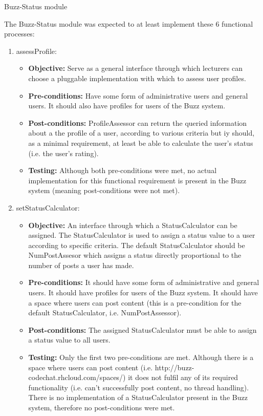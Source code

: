 \item Buzz-Status module
	
The Buzz-Status module was expected to at least implement these 6 functional processes:
	
\begin{enumerate}
	\item assessProfile:
	\begin{itemize}
		\item\textbf{Objective: } Serve as a general interface through which lecturers can choose a pluggable implementation with which to assess user profiles.
		\item\textbf{Pre-conditions: } Have some form of administrative users and general users. It should also have profiles for users of the Buzz system. 
		\item\textbf{Post-conditions: } ProfileAssessor can return the queried information about a the profile of a user, according to various criteria but iy should, as a minimal requirement, at least be able to calculate the user’s status (i.e. the user’s rating).
		\item\textbf{Testing: } Although both pre-conditions were met, no actual implementation for this functional requirement is present in the Buzz system (meaning post-conditions were not met).
	\end{itemize}
\item setStatusCalculator:
	\begin{itemize}
		\item\textbf{Objective: } An interface through which a StatusCalculator can be assigned. The StatusCalculator is used to assign a status value to a user according to specific criteria. The default StatusCalculator should be NumPostAssesor which assigns a status directly proportional to the number of posts a user has made.
		\item\textbf{Pre-conditions: } It should have some form of administrative and general users. It should have profiles for users of the Buzz system. It should have a space where users can post content (this is a pre-condition for the default StatusCalculator, i.e. NumPostAssessor).
		\item\textbf{Post-conditions: } The assigned StatusCalculator must be able to assign a status value to all users.
		\item\textbf{Testing: } Only the first two pre-conditions are met. Although there is a space where users can post content (i.e. http://buzz-codechat.rhcloud.com/spaces/) it does not fulfil any of its required functionality (i.e. can’t successfully post content, no thread handling). There is no implementation of a StatusCalculator present in the Buzz system, therefore no post-conditions were met.

\end{itemize}
\end{enumerate}
